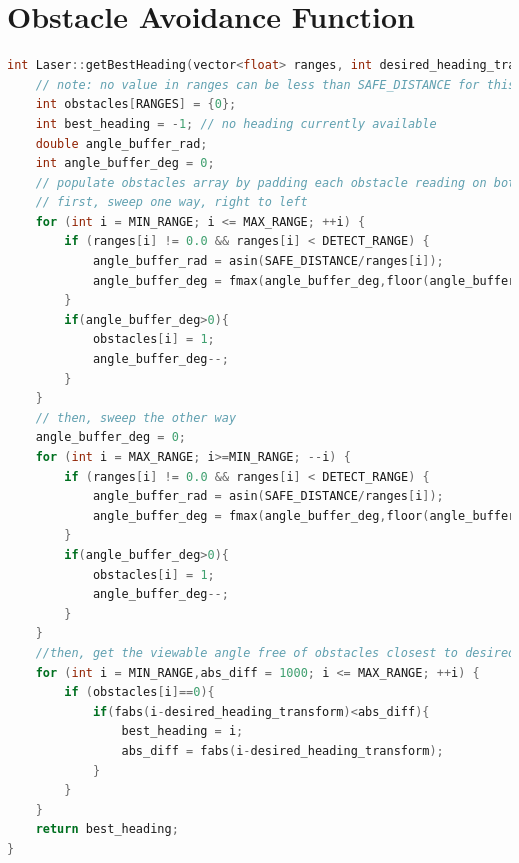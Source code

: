\documentclass[titlepage,12pt,a4paper]{article}
\begin{document}
\section{Obstacle Avoidance Function}
\label{appendix:obstacle_avoidance}
\begin{lstlisting}[language=C++]
int Laser::getBestHeading(vector<float> ranges, int desired_heading_transform) const {
	// note: no value in ranges can be less than SAFE_DISTANCE for this function to work
	int obstacles[RANGES] = {0};
	int best_heading = -1; // no heading currently available
	double angle_buffer_rad;
	int angle_buffer_deg = 0;
	// populate obstacles array by padding each obstacle reading on both sides
	// first, sweep one way, right to left
	for (int i = MIN_RANGE; i <= MAX_RANGE; ++i) {
		if (ranges[i] != 0.0 && ranges[i] < DETECT_RANGE) {
			angle_buffer_rad = asin(SAFE_DISTANCE/ranges[i]);
			angle_buffer_deg = fmax(angle_buffer_deg,floor(angle_buffer_rad * 180/M_PI));
		}
		if(angle_buffer_deg>0){
			obstacles[i] = 1;
			angle_buffer_deg--;
		}
	}
	// then, sweep the other way
	angle_buffer_deg = 0;
	for (int i = MAX_RANGE; i>=MIN_RANGE; --i) {
		if (ranges[i] != 0.0 && ranges[i] < DETECT_RANGE) {
			angle_buffer_rad = asin(SAFE_DISTANCE/ranges[i]);
			angle_buffer_deg = fmax(angle_buffer_deg,floor(angle_buffer_rad * 180/M_PI));
		}
		if(angle_buffer_deg>0){
			obstacles[i] = 1;
			angle_buffer_deg--;
		}
	}
	//then, get the viewable angle free of obstacles closest to desired heading
	for (int i = MIN_RANGE,abs_diff = 1000; i <= MAX_RANGE; ++i) {
		if (obstacles[i]==0){
			if(fabs(i-desired_heading_transform)<abs_diff){
				best_heading = i;
				abs_diff = fabs(i-desired_heading_transform);
			}
		}
	}
	return best_heading;
}
\end{lstlisting}
\end{document}
